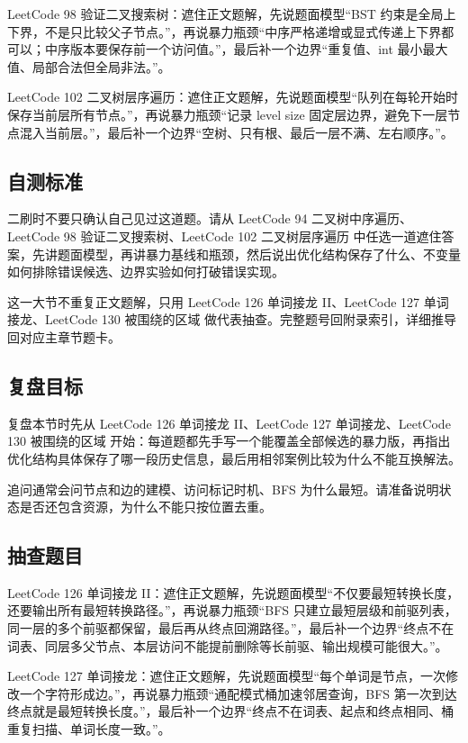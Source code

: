 LeetCode 98 验证二叉搜索树：遮住正文题解，先说题面模型“BST 约束是全局上下界，不是只比较父子节点。”，再说暴力瓶颈“中序严格递增或显式传递上下界都可以；中序版本要保存前一个访问值。”，最后补一个边界“重复值、int 最小最大值、局部合法但全局非法。”。

LeetCode 102 二叉树层序遍历：遮住正文题解，先说题面模型“队列在每轮开始时保存当前层所有节点。”，再说暴力瓶颈“记录 level size 固定层边界，避免下一层节点混入当前层。”，最后补一个边界“空树、只有根、最后一层不满、左右顺序。”。

\subsection{自测标准}

二刷时不要只确认自己见过这道题。请从 LeetCode 94 二叉树中序遍历、LeetCode 98 验证二叉搜索树、LeetCode 102 二叉树层序遍历 中任选一道遮住答案，先讲题面模型，再讲暴力基线和瓶颈，然后说出优化结构保存了什么、不变量如何排除错误候选、边界实验如何打破错误实现。

这一大节不重复正文题解，只用 LeetCode 126 单词接龙 II、LeetCode 127 单词接龙、LeetCode 130 被围绕的区域 做代表抽查。完整题号回附录索引，详细推导回对应主章节题卡。

\subsection{复盘目标}

复盘本节时先从 LeetCode 126 单词接龙 II、LeetCode 127 单词接龙、LeetCode 130 被围绕的区域 开始：每道题都先手写一个能覆盖全部候选的暴力版，再指出优化结构具体保存了哪一段历史信息，最后用相邻案例比较为什么不能互换解法。

追问通常会问节点和边的建模、访问标记时机、BFS 为什么最短。请准备说明状态是否还包含资源，为什么不能只按位置去重。

\subsection{抽查题目}

LeetCode 126 单词接龙 II：遮住正文题解，先说题面模型“不仅要最短转换长度，还要输出所有最短转换路径。”，再说暴力瓶颈“BFS 只建立最短层级和前驱列表，同一层的多个前驱都保留，最后再从终点回溯路径。”，最后补一个边界“终点不在词表、同层多父节点、本层访问不能提前删除等长前驱、输出规模可能很大。”。

LeetCode 127 单词接龙：遮住正文题解，先说题面模型“每个单词是节点，一次修改一个字符形成边。”，再说暴力瓶颈“通配模式桶加速邻居查询，BFS 第一次到达终点就是最短转换长度。”，最后补一个边界“终点不在词表、起点和终点相同、桶重复扫描、单词长度一致。”。

